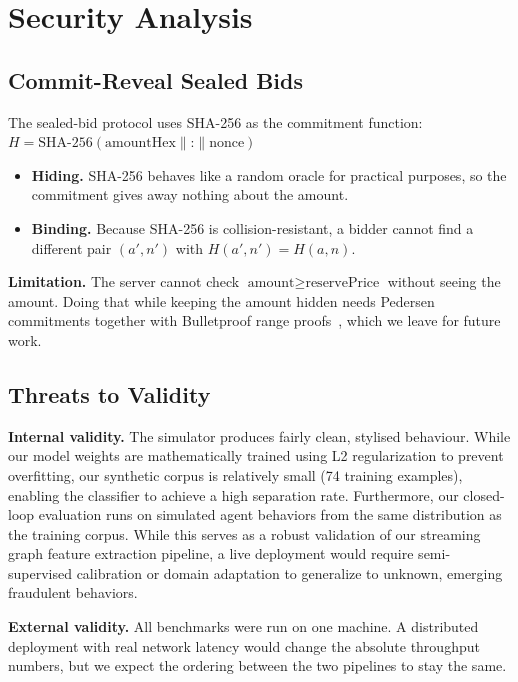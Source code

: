 \documentclass[conference]{IEEEtran}
\begin{document}
\section{Security Analysis}
\label{sec:security}

\subsection{Commit-Reveal Sealed Bids}

The sealed-bid protocol uses SHA-256 as the commitment function:
$H = \text{SHA-256}(\text{amountHex} \| \text{:} \| \text{nonce})$

\begin{itemize}
  \item \textbf{Hiding.} SHA-256 behaves like a random oracle for
    practical purposes, so the commitment gives away nothing about the
    amount.
  \item \textbf{Binding.} Because SHA-256 is collision-resistant, a
    bidder cannot find a different pair $(a', n')$ with
    $H(a', n') = H(a, n)$.
\end{itemize}

\textbf{Limitation.} The server cannot check
$\text{amount} \geq \text{reservePrice}$ without seeing the amount.
Doing that while keeping the amount hidden needs Pedersen commitments
together with Bulletproof range proofs~\cite{Bunz2018}, which we leave
for future work.

\subsection{Threats to Validity}

\textbf{Internal validity.} The simulator produces fairly clean,
stylised behaviour. While our model weights are mathematically trained using
L2 regularization to prevent overfitting, our synthetic corpus is relatively small
(74 training examples), enabling the classifier to achieve a high separation rate.
Furthermore, our closed-loop evaluation runs on simulated agent behaviors from
the same distribution as the training corpus. While this serves as a robust
validation of our streaming graph feature extraction pipeline, a live deployment
would require semi-supervised calibration or domain adaptation to generalize to
unknown, emerging fraudulent behaviors.

\textbf{External validity.} All benchmarks were run on one machine. A
distributed deployment with real network latency would change the
absolute throughput numbers, but we expect the ordering between the two
pipelines to stay the same.
\end{document}

